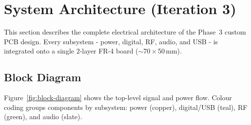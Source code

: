 
\section{System Architecture (Iteration 3)}

This section describes the complete electrical architecture of the Phase~3
custom PCB design.  Every subsystem - power, digital, RF, audio, and USB - is
integrated onto a single 2-layer FR-4 board ($\sim$70\,$\times$\,50\,mm).

\subsection{Block Diagram}

Figure~\ref{fig:block-diagram} shows the top-level signal and power flow.
Colour coding groups components by subsystem: \textcolor{brandcopper}{power}
(copper), \textcolor{brandteal}{digital/USB} (teal),
\textcolor{decisiongreen}{RF} (green), and
\textcolor{brandslate}{audio} (slate).

